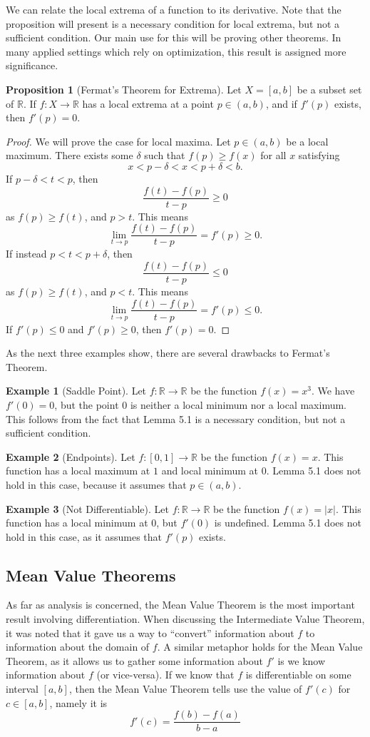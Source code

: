 \documentclass{article}
\newcommand{\R}{\mathbb{R}}
\theoremstyle{definition}
\newtheorem{proposition}{Proposition}[section]
\newtheorem{example}{Example}[section]
\begin{document}
	We can relate the local extrema of a function to its derivative. Note that the proposition will present is a necessary condition for local extrema, but not a sufficient condition. Our main use for this will be proving other theorems. In many applied settings which rely on optimization, this result is assigned more significance. 
	\begin{proposition}[Fermat's Theorem for Extrema]
		Let $ X=[a,b] $ be a subset set of $ \R $. If $ f:X\to\R $ has a local extrema at a point $ p\in(a,b) $, and if $ f'(p) $ exists, then $ f'(p)=0 $.  
	\end{proposition} 
	\begin{proof}
		We will prove the case for local maxima. Let $ p\in (a,b) $ be a local maximum. There exists some $ \delta $ such that $ f(p)\ge f(x) $ for all $ x $ satisfying $$ x<p-\delta<x<p+\delta<b .$$
		If $ p-\delta<t<p $, then $$ \frac{f(t)-f(p)}{t-p}\ge 0$$ as $ f(p)\ge f(t)  $, and $ p>t $. This means $$ \lim_{t\to p}\frac{f(t)-f(p)}{t-p}=f'(p)\ge 0 .$$ 	If instead $ p<t<p+\delta $, then $$ \frac{f(t)-f(p)}{t-p}\le 0$$ as $ f(p)\ge f(t)  $, and $ p<t $. This means $$ \lim_{t\to p}\frac{f(t)-f(p)}{t-p}=f'(p)\le 0 .$$ If $ f'(p)\le 0 $ and $ f'(p)\ge 0 $, then $ f'(p)=0 $.
	\end{proof}
	As the next three examples show, there are several drawbacks to Fermat's Theorem.
	\begin{example}[Saddle Point]
		Let $ f:\R\to\R $ be the function $ f(x)=x^3 $. We have $ f'(0)=0 $, but the point $ 0 $ is neither a local minimum nor a local maximum. This follows from the fact that Lemma 5.1 is a necessary condition, but not a sufficient condition. 
	\end{example}
	\begin{example}[Endpoints]
		Let $ f:[0,1]\to\R $ be the function $ f(x)=x $. This function has a local maximum at $ 1 $ and local minimum at $ 0 $. Lemma 5.1 does not hold in this case, because it assumes that $ p\in (a,b) $.
	\end{example} 
	\begin{example}[Not Differentiable]
		Let $ f:\R\to\R $ be the function $ f(x)=|x| $. This function has a local minimum at $ 0 $, but $ f'(0)$ is undefined. Lemma 5.1 does not hold in this case, as it assumes that $ f'(p) $ exists.
	\end{example} 
	
	\subsection{Mean Value Theorems}
	As far as analysis is concerned, the Mean Value Theorem is the most important result involving differentiation. When discussing the Intermediate Value Theorem, it was noted that it gave us a way to ``convert'' information about $ f $ to information about the domain of $ f $. A similar metaphor holds for the Mean Value Theorem, as it allows us to gather some information about $ f' $ is we know information about $ f $ (or vice-versa). If we know that $ f $ is differentiable on some interval $ [a,b] $, then the Mean Value Theorem tells use the value of $ f'(c) $ for $ c\in[a,b] $, namely it is $$f'(c)=\frac{f(b)-f(a)}{b-a} $$ 
	
\end{document}
